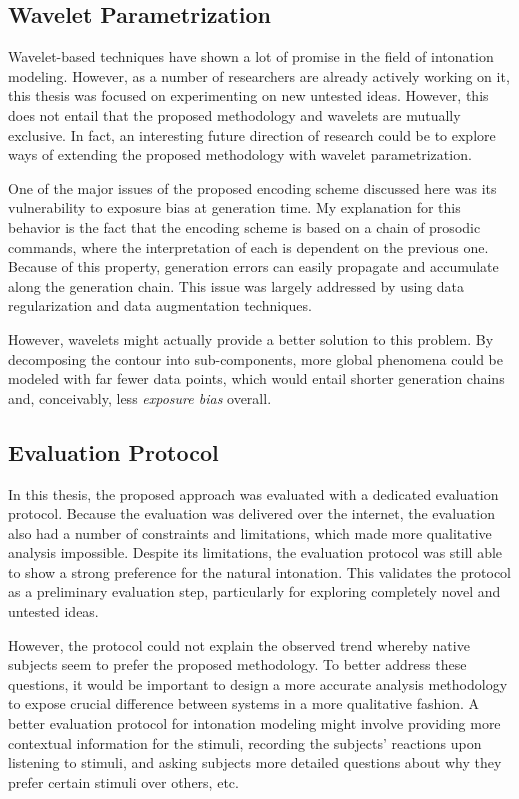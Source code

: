 \subsection{Wavelet Parametrization}

Wavelet-based techniques have shown a lot of promise in the field of intonation modeling.
However, as a number of researchers are already actively working on it, this thesis was focused on experimenting on new untested ideas.
However, this does not entail that the proposed methodology and wavelets are mutually exclusive.
In fact, an interesting future direction of research could be to explore ways of extending the proposed methodology with wavelet parametrization.

One of the major issues of the proposed encoding scheme discussed here was its vulnerability to exposure bias at generation time.
My explanation for this behavior is the fact that the encoding scheme is based on a chain of prosodic commands, where the interpretation of each is dependent on the previous one.
Because of this property, generation errors can easily propagate and accumulate along the generation chain.
This issue was largely addressed by using data regularization and data augmentation techniques.

However, wavelets might actually provide a better solution to this problem.
By decomposing the contour into sub-components, more global phenomena could be modeled with far fewer data points, which would entail shorter generation chains and, conceivably, less \emph{exposure bias} overall.

\subsection{Evaluation Protocol}

In this thesis, the proposed approach was evaluated with a dedicated evaluation protocol.
Because the evaluation was delivered over the internet, the evaluation also had a number of constraints and limitations, which made more qualitative analysis impossible.
Despite its limitations, the evaluation protocol was still able to show a strong preference for the natural intonation.
This validates the protocol as a preliminary evaluation step, particularly for exploring completely novel and untested ideas.

However, the protocol could not explain the observed trend whereby native subjects seem to prefer the proposed methodology.
To better address these questions, it would be important to design a more accurate analysis methodology to expose crucial difference between systems in a more qualitative fashion.
A better evaluation protocol for intonation modeling might involve providing more contextual information for the stimuli, recording the subjects' reactions upon listening to stimuli, and asking subjects more detailed questions about why they prefer certain stimuli over others, etc.

